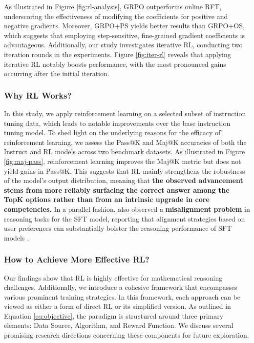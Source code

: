 \begin{itemize}[topsep=0pt]
As illustrated in Figure \ref{fig:rl-analysis}, GRPO outperforms online RFT, underscoring the effectiveness of modifying the coefficients for positive and negative gradients. Moreover, GRPO+PS yields better results than GRPO+OS, which suggests that employing step-sensitive, fine-grained gradient coefficients is advantageous. Additionally, our study investigates iterative RL, conducting two iteration rounds in the experiments. Figure \ref{fig:iter-rl} reveals that applying iterative RL notably boosts performance, with the most pronounced gains occurring after the initial iteration.

\subsubsection{Why RL Works?} In this study, we apply reinforcement learning on a selected subset of instruction tuning data, which leads to notable improvements over the base instruction tuning model. To shed light on the underlying reasons for the efficacy of reinforcement learning, we assess the Pass@K and Maj@K accuracies of both the Instruct and RL models across two benchmark datasets. As illustrated in Figure \ref{fig:maj-pass}, reinforcement learning improves the Maj@K metric but does not yield gains in Pass@K. This suggests that RL mainly strengthens the robustness of the model's output distribution, meaning that \textbf{the observed advancement stems from more reliably surfacing the correct answer among the TopK options rather than from an intrinsic upgrade in core competencies.} In a parallel fashion, \citep{wang2023making} also observed a \textbf{misalignment problem} in reasoning tasks for the SFT model, reporting that alignment strategies based on user preferences can substantially bolster the reasoning performance of SFT models \citep{yuan2023rrhf,song2023preference,wang2023making}.

\subsubsection{How to Achieve More Effective RL?}
\label{sec:effec_rl}
Our findings show that RL is highly effective for mathematical reasoning challenges. Additionally, we introduce a cohesive framework that encompasses various prominent training strategies. In this framework, each approach can be viewed as either a form of direct RL or its simplified version. As outlined in Equation \ref{eq:objective}, the paradigm is structured around three primary elements: Data Source, Algorithm, and Reward Function. We discuss several promising research directions concerning these components for future exploration.


\end{itemize}
